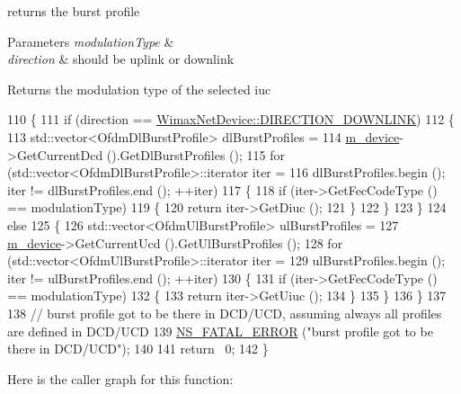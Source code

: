 returns the burst profile 


\begin{DoxyParams}{Parameters}
{\em modulation\+Type} & \\
\hline
{\em direction} & should be uplink or downlink \\
\hline
\end{DoxyParams}
\begin{DoxyReturn}{Returns}
the modulation type of the selected iuc 
\end{DoxyReturn}

\begin{DoxyCode}
110 \{
111   \textcolor{keywordflow}{if} (direction == \hyperlink{classns3_1_1WimaxNetDevice_a194b6cf7eb59582328eb2531dc9ed884a5873dae7c36e21d904ae2d6922835e89}{WimaxNetDevice::DIRECTION\_DOWNLINK})
112     \{
113       std::vector<OfdmDlBurstProfile> dlBurstProfiles =
114         \hyperlink{classns3_1_1BurstProfileManager_a06f0dc89653cc9299d1b6f3cb050afc1}{m\_device}->GetCurrentDcd ().GetDlBurstProfiles ();
115       \textcolor{keywordflow}{for} (std::vector<OfdmDlBurstProfile>::iterator iter =
116              dlBurstProfiles.begin (); iter != dlBurstProfiles.end (); ++iter)
117         \{
118           \textcolor{keywordflow}{if} (iter->GetFecCodeType () == modulationType)
119             \{
120               \textcolor{keywordflow}{return} iter->GetDiuc ();
121             \}
122         \}
123     \}
124   \textcolor{keywordflow}{else}
125     \{
126       std::vector<OfdmUlBurstProfile> ulBurstProfiles =
127         \hyperlink{classns3_1_1BurstProfileManager_a06f0dc89653cc9299d1b6f3cb050afc1}{m\_device}->GetCurrentUcd ().GetUlBurstProfiles ();
128       \textcolor{keywordflow}{for} (std::vector<OfdmUlBurstProfile>::iterator iter =
129              ulBurstProfiles.begin (); iter != ulBurstProfiles.end (); ++iter)
130         \{
131           \textcolor{keywordflow}{if} (iter->GetFecCodeType () == modulationType)
132             \{
133               \textcolor{keywordflow}{return} iter->GetUiuc ();
134             \}
135         \}
136     \}
137 
138   \textcolor{comment}{// burst profile got to be there in DCD/UCD, assuming always all profiles are defined in DCD/UCD}
139   \hyperlink{group__fatal_ga5131d5e3f75d7d4cbfd706ac456fdc85}{NS\_FATAL\_ERROR} (\textcolor{stringliteral}{"burst profile got to be there in DCD/UCD"});
140 
141   \textcolor{keywordflow}{return} ~0;
142 \}
\end{DoxyCode}


Here is the caller graph for this function\+:


